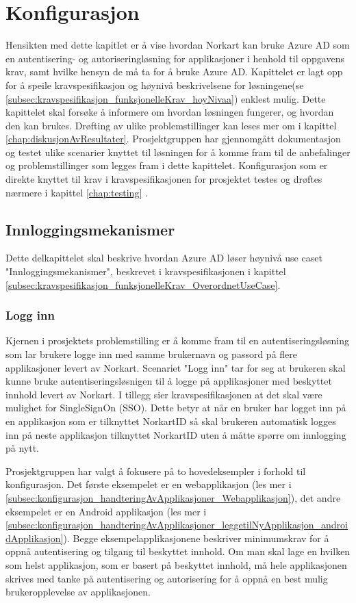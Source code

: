 \chapter{Konfigurasjon}
\label{chap:konfigurasjon}
Hensikten med dette kapitlet er å vise hvordan Norkart kan bruke Azure AD som en autentisering- og autoriseringløsning for applikasjoner i henhold til oppgavens krav, samt hvilke hensyn de må ta for å bruke Azure AD. Kapittelet er lagt opp for å speile kravspesifikasjon og høynivå beskrivelsene for løsningene(se \ref{subsec:kravspesifikasjon_funksjonelleKrav_hoyNivaa}) enklest mulig. Dette kapittelet skal forsøke å informere om hvordan løsningen fungerer, og hvordan den kan brukes. Drøfting av ulike problemstillinger kan leses mer om i kapittel \ref{chap:diskusjonAvResultater}. Prosjektgruppen har gjennomgått dokumentasjon og testet ulike scenarier knyttet til løsningen for å komme fram til de anbefalinger og problemstillinger som legges fram i dette kapittelet. Konfigurasjon som er direkte knyttet til krav i kravspesifikasjonen for prosjektet testes og drøftes nærmere i kapittel \ref{chap:testing} .

\section{Innloggingsmekanismer}
\label{sec:konfigurasjon_innloggingsmekanismer}
Dette delkapittelet skal beskrive hvordan Azure AD løser høynivå use caset "Innloggingsmekanismer", beskrevet i kravspesifikasjonen i kapittel \ref{subsec:kravspesifikasjon_funksjonelleKrav_OverordnetUseCase}. 

\subsection{Logg inn}
\label{subsec:konfigurasjon_innloggingsmekanismer_loggInn}
Kjernen i prosjektets problemstilling er å komme fram til en autentiseringsløsning som lar brukere logge inn med samme brukernavn og passord på flere applikasjoner levert av Norkart. Scenariet "Logg inn" tar for seg at brukeren skal kunne bruke autentiseringsløsnigen til å logge på applikasjoner med beskyttet innhold levert av Norkart. I tillegg sier kravspesifikasjonen at det skal være mulighet for SingleSignOn (SSO). Dette betyr at når en bruker har logget inn på en applikasjon som er tilknyttet NorkartID så skal brukeren automatisk logges inn på neste applikasjon tilknyttet NorkartID uten å måtte spørre om innlogging på nytt.

Prosjektgruppen har valgt å fokusere på to hovedeksempler i forhold til konfigurasjon. Det første eksempelet er en webapplikasjon (les mer i \ref{subsec:konfigurasjon_handteringAvApplikasjoner_Webapplikasjon}), det andre eksempelet er en Android applikasjon (les mer i \ref{subsec:konfigurasjon_handteringAvApplikasjoner_leggetilNyApplikasjon_androidApplikasjon}). Begge eksempelapplikasjonene beskriver minimumskrav for å oppnå autentisering og tilgang til beskyttet innhold. Om man skal lage en hvilken som helst applikasjon, som er basert på beskyttet innhold, må hele applikasjonen skrives med tanke på autentisering og autorisering for å oppnå en best mulig brukeropplevelse av applikasjonen. 

